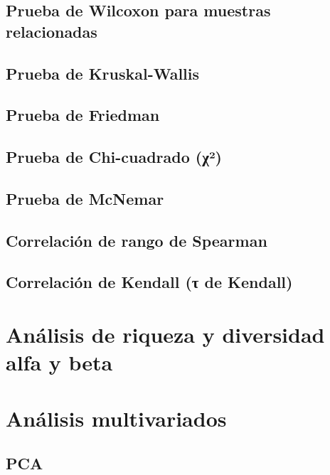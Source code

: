 \documentclass[
]{book}
\begin{document}
\section{Prueba de Wilcoxon para muestras relacionadas}\label{prueba-de-wilcoxon-para-muestras-relacionadas}

\section{Prueba de Kruskal-Wallis}\label{prueba-de-kruskal-wallis}

\section{Prueba de Friedman}\label{prueba-de-friedman}

\section{Prueba de Chi-cuadrado (χ²)}\label{prueba-de-chi-cuadrado-ux3c7uxb2}

\section{Prueba de McNemar}\label{prueba-de-mcnemar}

\section{Correlación de rango de Spearman}\label{correlaciuxf3n-de-rango-de-spearman}

\section{Correlación de Kendall (τ de Kendall)}\label{correlaciuxf3n-de-kendall-ux3c4-de-kendall}

\chapter{Análisis de riqueza y diversidad alfa y beta}\label{anuxe1lisis-de-riqueza-y-diversidad-alfa-y-beta}

\chapter{Análisis multivariados}\label{anuxe1lisis-multivariados}

\section{PCA}\label{pca}
\end{document}
